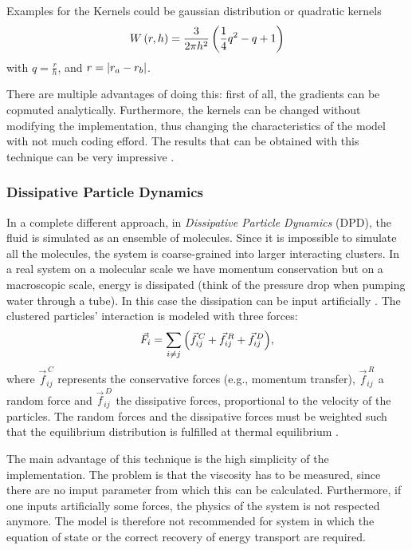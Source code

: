 Examples for the Kernels could be gaussian distribution or quadratic kernels
\begin{equation*}
W\left(r,h\right) = \frac{3}{2\pi h^2}\left(\frac{1}{4} q^2 -q +1\right)
\end{equation*}
with $q=\frac{r}{h}$, and $r=\left|r_a-r_b\right|$.

There are multiple advantages of doing this: first of all, the gradients can be copmuted analytically. Furthermore, the kernels can be changed without modifying the implementation, thus changing the characteristics of the model with not much coding efford. The results that can be obtained with this technique can be very impressive \citep{sph3}.



\subsubsection*{Dissipative Particle Dynamics}

In a complete different approach, in \emph{Dissipative Particle Dynamics} (DPD), the fluid is simulated as an ensemble of molecules. Since it is impossible to simulate all the molecules, the system is coarse-grained into larger interacting clusters. In a real system on a molecular scale we have momentum conservation but on a macroscopic scale, energy is dissipated (think of the pressure drop when pumping water through a tube). In this case the dissipation can be input artificially \citep{dpd1}. The clustered particles' interaction is modeled with three forces:
\begin{equation}
\vec{F}_i=\sum_{i\neq j}{\left(\vec{f}_{ij}^{\,C} + \vec{f}_{ij}^{\,R} + \vec{f}_{ij}^{\,D}\right)},
\end{equation}
where $\vec{f}_{ij}^{\,C}$ represents the conservative forces (e.g., momentum transfer), $\vec{f}_{ij}^{\,R}$ a random force and $\vec{f}_{ij}^{\,D}$ the dissipative forces, proportional to the velocity of the particles. The random forces and the dissipative forces  must be weighted such that the equilibrium distribution is fulfilled at thermal equilibrium \citep{dpd2}.

The main advantage of this technique is the high simplicity of the implementation. The problem is that the viscosity has to be measured, since there are no imput parameter from which this can be calculated. Furthermore, if one inputs artificially some forces, the physics of the system is not respected anymore. The model is therefore not recommended for system in which the equation of state or the correct recovery of energy transport are required. 

